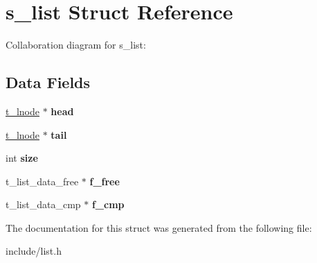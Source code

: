 \hypertarget{structs__list}{}\section{s\+\_\+list Struct Reference}
\label{structs__list}


Collaboration diagram for s\+\_\+list\+:
\subsection*{Data Fields}
\begin{DoxyCompactItemize}
\item 
\hypertarget{structs__list_a43151a7fd223a88c82cdc6fe1de89c28}{}\hyperlink{structs__lnode}{t\+\_\+lnode} $\ast$ {\bfseries head}\label{structs__list_a43151a7fd223a88c82cdc6fe1de89c28}

\item 
\hypertarget{structs__list_a2474d511089fed7e181ad40d371787fd}{}\hyperlink{structs__lnode}{t\+\_\+lnode} $\ast$ {\bfseries tail}\label{structs__list_a2474d511089fed7e181ad40d371787fd}

\item 
\hypertarget{structs__list_a3bf0ae0bf073d51a6d81b8d90d23e29f}{}int {\bfseries size}\label{structs__list_a3bf0ae0bf073d51a6d81b8d90d23e29f}

\item 
\hypertarget{structs__list_a8ff53bfc27ae587862e08566df35d772}{}t\+\_\+list\+\_\+data\+\_\+free $\ast$ {\bfseries f\+\_\+free}\label{structs__list_a8ff53bfc27ae587862e08566df35d772}

\item 
\hypertarget{structs__list_a11fc71f40e9fb5e6eb4edd467e21e603}{}t\+\_\+list\+\_\+data\+\_\+cmp $\ast$ {\bfseries f\+\_\+cmp}\label{structs__list_a11fc71f40e9fb5e6eb4edd467e21e603}

\end{DoxyCompactItemize}


The documentation for this struct was generated from the following file\+:\begin{DoxyCompactItemize}
\item 
include/list.\+h\end{DoxyCompactItemize}
